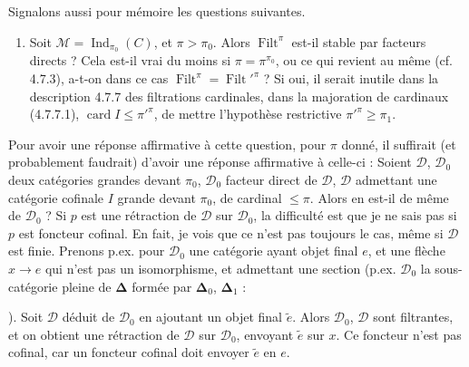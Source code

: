 \documentclass[11pt]{article}
\newcommand{\printedpage}[1]{\marginpar{\footnotesize p.~#1}}
\newcommand{\msp}[1]{\marginpar{\footnotesize [#1]}}
\newcommand{\Ind}{\operatorname{Ind}}
\newcommand{\Filt}{\operatorname{Filt}}
\newcommand{\card}{\operatorname{card}}
\begin{document}
\msp{page 203}
Signalons aussi pour mémoire les questions suivantes.
\begin{enumerate}
\item[3)] Soit $\mathcal{M}=\Ind_{\pi_0}(C)$, et $\pi>\pi_0$. Alors $\Filt^\pi$ est-il stable par facteurs directs ? Cela est-il vrai du moins si $\pi=\pi^{\pi_0}$, ou ce qui revient au même (cf. 4.7.3), a-t-on dans ce cas $\Filt^\pi=\Filt'^{\pi}$ ? Si oui, il serait inutile dans la description 4.7.7 des filtrations cardinales, dans la majoration de cardinaux (4.7.7.1), $\card I\leqslant\pi'^{\pi}$, de mettre l'hypothèse restrictive $\pi'^{\pi}\geqslant\pi_1$.
\end{enumerate}

Pour avoir une réponse affirmative à cette question, pour $\pi$ donné, il suffirait (et probablement faudrait) d'avoir une réponse affirmative à celle-ci : Soient $\mathcal{D}$, $\mathcal{D}_0$ deux catégories grandes devant $\pi_0$, $\mathcal{D}_0$ facteur direct de $\mathcal{D}$, $\mathcal{D}$ admettant une catégorie cofinale $I$ grande devant $\pi_0$, de cardinal $\leqslant\pi$. Alors en est-il de même de $\mathcal{D}_0$ ? Si $p$ est une rétraction de $\mathcal{D}$ sur $\mathcal{D}_0$, la difficulté est que je ne sais pas si $p$ est foncteur cofinal. En fait, je vois que
\printedpage{72}
\msp{page 204}
ce n'est pas toujours le cas, même si $\mathcal{D}$ est finie. Prenons p.ex. pour $\mathcal{D}_0$ une catégorie ayant objet final $e$, et une flèche $x\longrightarrow e$ qui n'est pas un isomorphisme, et admettant une section (p.ex. $\mathcal{D}_0$ la sous-catégorie pleine de $\boldsymbol{\Delta}$ formée par $\boldsymbol{\Delta}_0$, $\boldsymbol{\Delta}_1$ :  ). Soit $\mathcal{D}$ déduit de $\mathcal{D}_0$ en ajoutant un objet final $\tilde{e}$. Alors $\mathcal{D}_0$, $\mathcal{D}$ sont filtrantes, et on obtient une rétraction de $\mathcal{D}$ sur $\mathcal{D}_0$, envoyant $\tilde{e}$ sur $x$. Ce foncteur n'est pas cofinal, car un foncteur cofinal doit envoyer $\tilde{e}$ en $e$.
\end{document}
